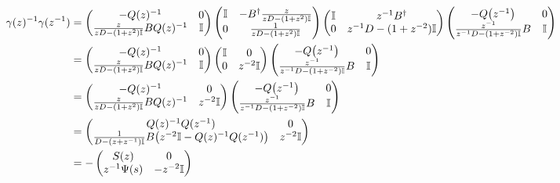 \documentclass[../thesis-main/thesis-main]{subfiles}
\begin{document}
\begin{align}
  \gamma (z)^{-1} \gamma(z^{-1}) &= \begin{pmatrix}
      - Q(z)^{-1} & 0\\
      \frac{z}{z D - (1+z^2)\mathbb{I}} B Q(z)^{-1} & \mathbb{I}
    \end{pmatrix}
    \begin{pmatrix}
      \mathbb{I} & - B^{\dag} \frac{z}{zD - (1+z^2)\mathbb{I}}\\
      0 & \frac{1}{zD - (1+z^2)\mathbb{I}}
    \end{pmatrix}
    \begin{pmatrix} \mathbb{I} & z^{-1}B^\dag\\
    0 & z^{-1} D - (1+ z^{-2}) \mathbb{I} \end{pmatrix}
    \begin{pmatrix} - Q\big(z^{-1}\big) & 0\\
      \frac{z^{-1}}{z^{-1}D - (1+ z^{-2})\mathbb{I}}B & \mathbb{I}\end{pmatrix} \\
  &=  \begin{pmatrix}
      - Q(z)^{-1} & 0\\
      \frac{z}{z D - (1+z^2)\mathbb{I}} B Q(z)^{-1} & \mathbb{I}
    \end{pmatrix}
    \begin{pmatrix}
      \mathbb{I} & 0\\
      0 &z^{-2}\mathbb{I} \end{pmatrix}
    \begin{pmatrix} - Q\big(z^{-1}\big) & 0\\
      \frac{z^{-1}}{z^{-1}D - (1+ z^{-2})\mathbb{I}}B & \mathbb{I}\end{pmatrix} \\
   &= \begin{pmatrix}
      - Q(z)^{-1} & 0\\
      \frac{z}{z D - (1+z^2)\mathbb{I}} B Q(z)^{-1} &z^{-2} \mathbb{I}
    \end{pmatrix}
    \begin{pmatrix} - Q\big(z^{-1}\big) & 0\\
      \frac{z^{-1}}{z^{-1}D - (1+ z^{-2})\mathbb{I}}B & \mathbb{I}\end{pmatrix} \\
  &= \begin{pmatrix}
      Q(z)^{-1}Q(z^{-1}) & 0\\
      \frac{1}{D - (z+z^{-1})\mathbb{I} }B \big(z^{-2} \mathbb{I} - Q(z)^{-1}Q(z^{-1}) \big) & z^{-2}\mathbb{I}
    \end{pmatrix}\\
  &= -\begin{pmatrix}
      S(z) & 0\\
     z^{-1} \Psi(s) & -z^{-2}\mathbb{I}
    \end{pmatrix}\label{eq:gamma_gives_S}
\end{align}
\end{document}
